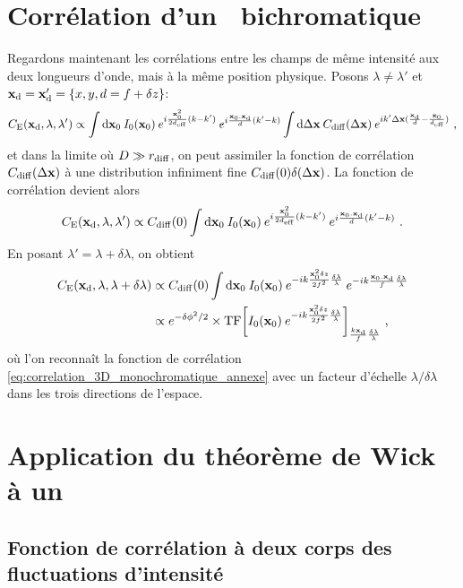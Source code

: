 \section{Corrélation d'un \speckle\ bichromatique}
Regardons maintenant les corrélations entre les champs de même intensité aux deux longueurs d'onde, mais à la même position physique. Posons $\lambda\neq\lambda'$ et $\mathbf{x}_{\mathrm{d}}=\mathbf{x}_{\mathrm{d}}'=\lbrace x,y,d=f+\delta z \rbrace$:
\begin{equation}
C_{\mathrm{E}}(\mathbf{x}_{\mathrm{d}},\lambda,\lambda') \propto \int{\mathop{}\mathopen{}\mathrm{d}\mathbf{x}_0\: I_0(\mathbf{x}_0) \: e^{i\frac{\mathbf{x}_0^2}{2d_{\mathrm{eff}}}(k-k')} \: e^{i\frac{\mathbf{x}_0.\mathbf{x}_{\mathrm{d}}}{d}(k'-k)} \int{\mathop{}\mathopen{}\mathrm{d}\Delta\mathbf{x}\: C_{\mathrm{diff}}(\Delta\mathbf{x}) \: e^{i k' \Delta\mathbf{x}(\frac{\mathbf{x}_{\mathrm{d}}}{d}-\frac{\mathbf{x}_0}{d_{\mathrm{eff}}})}}} \text{ ,}
\end{equation}
et dans la limite où $D\gg r_{\mathrm{diff}}$, on peut assimiler la fonction de corrélation $C_{\mathrm{diff}}(\Delta\mathbf{x})$  à une distribution infiniment fine $C_{\mathrm{diff}}(0) \delta(\Delta\mathbf{x})$. La fonction de corrélation devient alors
\begin{equation}
C_{\mathrm{E}}(\mathbf{x}_{\mathrm{d}},\lambda,\lambda') \propto  C_{\mathrm{diff}}(0) \int{\mathop{}\mathopen{}\mathrm{d}\mathbf{x}_0\: I_0(\mathbf{x}_0) \: e^{i\frac{\mathbf{x}_0^2}{2d_{\mathrm{eff}}}(k-k')} \: e^{i\frac{\mathbf{x}_0.\mathbf{x}_{\mathrm{d}}}{d}(k'-k)}} \text{ .}
\end{equation}
En posant $\lambda'=\lambda+ \delta \lambda$, on obtient
\begin{align}
C_{\mathrm{E}}(\mathbf{x}_{\mathrm{d}},\lambda, \lambda+\delta\lambda) &\propto C_{\mathrm{diff}}(0) \int{\mathop{}\mathopen{}\mathrm{d}\mathbf{x}_0\: I_0(\mathbf{x}_0) \: e^{-ik \frac{\mathbf{x}_0^2 \delta z}{2f^2} \frac{\delta \lambda}{\lambda}} \: e^{-ik \frac{\mathbf{x}_0.\mathbf{x}_{\mathrm{d}}}{f}\frac{\delta \lambda}{\lambda}}} \\
& \propto e^{-\delta\phi^2/2} \times \mathrm{TF}{\left[ I_0(\mathbf{x}_0)\: e^{-ik\frac{\mathbf{x}_0^2 \delta z}{2f^2} \frac{\delta\lambda}{\lambda}} \right]}_{\frac{k \mathbf{x}_{\mathrm{d}}}{f}\frac{\delta \lambda}{\lambda}} \text{ ,}
\end{align}
où l'on reconnaît la fonction de corrélation \ref{eq:correlation_3D_monochromatique_annexe} avec un facteur d'échelle $\lambda/\delta\lambda$ dans les trois directions de l'espace.




\section{Application du théorème de Wick à un \speckle }
\subsection{Fonction de corrélation à deux corps des fluctuations d'intensité}

